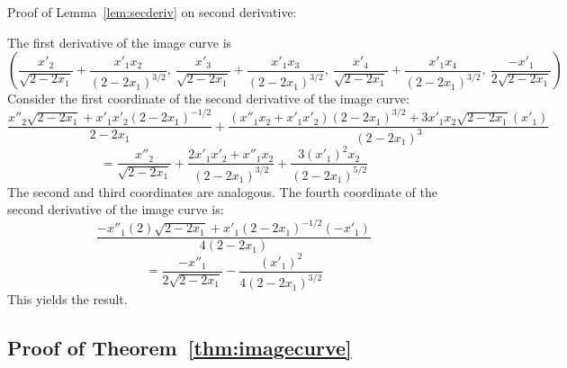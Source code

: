 \documentclass[12pt]{article}
\begin{document}
Proof of Lemma~\ref{lem:secderiv} on second derivative:

\prf
The first derivative of the image curve is 
\[
(\frac{x'_2}{\sqrt{2-2x_1}} + \frac{x'_1x_2}{(2-2x_1)^{3/2}},\ 
 \frac{x'_3}{\sqrt{2-2x_1}} + \frac{x'_1x_3}{(2-2x_1)^{3/2}},\ 
 \frac{x'_4}{\sqrt{2-2x_1}} + \frac{x'_1x_4}{(2-2x_1)^{3/2}},\ 
 \frac{-x'_1}{2\sqrt{2-2x_1}}) 
\]
Consider the first coordinate of the second derivative of the image curve:
\[
\frac{x''_2 \sqrt{2-2x_1} + x'_1x'_2 (2-2x_1)^{-1/2}}{2-2x_1} +
\frac{(x''_1 x_2 + x'_1 x'_2)(2-2x_1)^{3/2} + 3x'_1 x_2 \sqrt{2-2x_1}(x'_1)}{(2-2x_1)^3}
\]
\[
= \frac{x''_2}{\sqrt{2-2x_1}} + \frac{2x'_1 x'_2 + x''_1 x_2}{(2-2x_1)^{3/2}}
+ \frac{3(x'_1)^2 x_2}{(2-2x_1)^{5/2}}
\]
The second and third coordinates are analogous.
The fourth coordinate of the second derivative of the image curve is:
\[
\frac{-x''_1(2)\sqrt{2-2x_1} + x'_1(2-2x_1)^{-1/2} (-x'_1)}{4(2-2x_1)}
\]
\[
= \frac{-x''_1}{2\sqrt{2-2x_1}} - \frac{(x'_1)^2}{4(2-2x_1)^{3/2}}
\]
This yields the result.
\QED

\clearpage

\subsection{Proof of Theorem~\ref{thm:imagecurve}}
\end{document}
